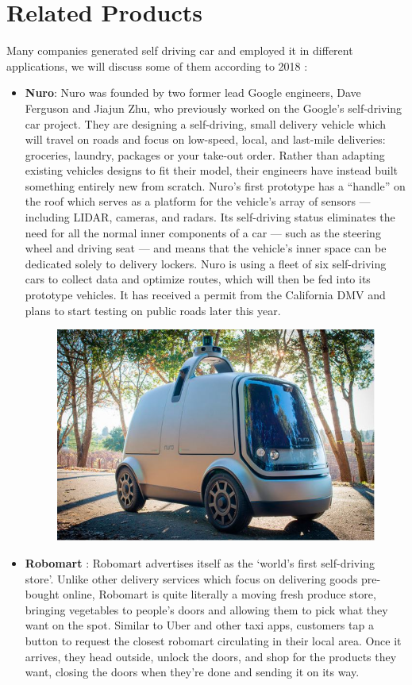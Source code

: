 \section{Related Products}
\hspace{2cm} Many companies generated self driving car and employed it in different applications, we will discuss some of them according to 2018 :
\par

\begin{itemize}
 \item \textbf{Nuro}: 
Nuro was founded by two former lead Google engineers, Dave Ferguson and Jiajun Zhu, who previously worked on the Google’s self-driving car project. They are designing a self-driving, small delivery vehicle which will travel on roads and focus on low-speed, local, and last-mile deliveries: groceries, laundry, packages or your take-out order. Rather than adapting existing vehicles designs to fit their model, their engineers have instead built something entirely new from scratch. Nuro’s first prototype has a “handle” on the roof which serves as a platform for the vehicle’s array of sensors — including LIDAR, cameras, and radars. Its self-driving status eliminates the need for all the normal inner components of a car — such as the steering wheel and driving seat — and means that the vehicle’s inner space can be dedicated solely to delivery lockers. Nuro is using a fleet of six self-driving cars to collect data and optimize routes, which will then be fed into its prototype vehicles. It has received a permit from the California DMV and plans to start testing on public roads later this year.\cite{web027}

\begin{figure}[H]%
    \center%
    \includegraphics[width=.5\textwidth]{images/Alaa/nuro.JPG}%
  \end{figure}

\par
 \item \textbf{Robomart } : 
Robomart advertises itself as the ‘world’s first self-driving store’. Unlike other delivery services which focus on delivering goods pre-bought online, Robomart is quite literally a moving fresh produce store, bringing vegetables to people’s doors and allowing them to pick what they want on the spot. Similar to Uber and other taxi apps, customers tap a button to request the closest robomart circulating in their local area. Once it arrives, they head outside, unlock the doors, and shop for the products they want, closing the doors when they’re done and sending it on its way. \cite{web027} 


\end{itemize}
